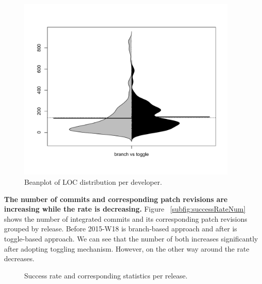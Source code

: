 \begin{figure}
\includegraphics[width=0.95\textwidth]{figure/avgLOC.pdf}
\caption{Beanplot of LOC distribution per developer.}
\label{fig:LOC}
\end{figure}


\textbf{The number of commits and corresponding patch revisions are increasing while the rate is decreasing.} Figure ~\ref{subfig:successRateNum} shows the number of integrated commits and its corresponding patch revisions grouped by release. Before 2015-W18 is branch-based approach and after is toggle-based approach. We can see that the number of both increases significantly after adopting toggling mechanism. However, on the other way around the rate decreases. 

\begin{figure}
\caption{Success rate and corresponding statistics per release.}
\label{fig:successRate}
\end{figure}


